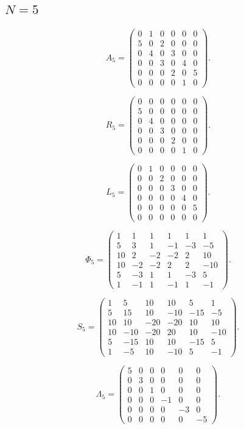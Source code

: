 \subsection{$N=5$}
\label{tab:matrices-N05}
\begingroup
\small
\setlength{\arraycolsep}{3pt}
\[
A_{5}=\begin{pmatrix}
0 & 1 & 0 & 0 & 0 & 0 \\
5 & 0 & 2 & 0 & 0 & 0 \\
0 & 4 & 0 & 3 & 0 & 0 \\
0 & 0 & 3 & 0 & 4 & 0 \\
0 & 0 & 0 & 2 & 0 & 5 \\
0 & 0 & 0 & 0 & 1 & 0
\end{pmatrix}.
\]
\endgroup

\begingroup
\small
\setlength{\arraycolsep}{3pt}
\[
R_{5}=\begin{pmatrix}
0 & 0 & 0 & 0 & 0 & 0 \\
5 & 0 & 0 & 0 & 0 & 0 \\
0 & 4 & 0 & 0 & 0 & 0 \\
0 & 0 & 3 & 0 & 0 & 0 \\
0 & 0 & 0 & 2 & 0 & 0 \\
0 & 0 & 0 & 0 & 1 & 0
\end{pmatrix}.
\]
\endgroup

\begingroup
\small
\setlength{\arraycolsep}{3pt}
\[
L_{5}=\begin{pmatrix}
0 & 1 & 0 & 0 & 0 & 0 \\
0 & 0 & 2 & 0 & 0 & 0 \\
0 & 0 & 0 & 3 & 0 & 0 \\
0 & 0 & 0 & 0 & 4 & 0 \\
0 & 0 & 0 & 0 & 0 & 5 \\
0 & 0 & 0 & 0 & 0 & 0
\end{pmatrix}.
\]
\endgroup

\begingroup
\small
\setlength{\arraycolsep}{3pt}
\[
\Phi_{5}=\begin{pmatrix}
1 & 1 & 1 & 1 & 1 & 1 \\
5 & 3 & 1 & -1 & -3 & -5 \\
10 & 2 & -2 & -2 & 2 & 10 \\
10 & -2 & -2 & 2 & 2 & -10 \\
5 & -3 & 1 & 1 & -3 & 5 \\
1 & -1 & 1 & -1 & 1 & -1
\end{pmatrix}.
\]
\endgroup

\begingroup
\small
\setlength{\arraycolsep}{3pt}
\[
S_{5}=\begin{pmatrix}
1 & 5 & 10 & 10 & 5 & 1 \\
5 & 15 & 10 & -10 & -15 & -5 \\
10 & 10 & -20 & -20 & 10 & 10 \\
10 & -10 & -20 & 20 & 10 & -10 \\
5 & -15 & 10 & 10 & -15 & 5 \\
1 & -5 & 10 & -10 & 5 & -1
\end{pmatrix}.
\]
\endgroup

\begingroup
\small
\setlength{\arraycolsep}{3pt}
\[
\Lambda_{5}=\begin{pmatrix}
5 & 0 & 0 & 0 & 0 & 0 \\
0 & 3 & 0 & 0 & 0 & 0 \\
0 & 0 & 1 & 0 & 0 & 0 \\
0 & 0 & 0 & -1 & 0 & 0 \\
0 & 0 & 0 & 0 & -3 & 0 \\
0 & 0 & 0 & 0 & 0 & -5
\end{pmatrix}.
\]
\endgroup

